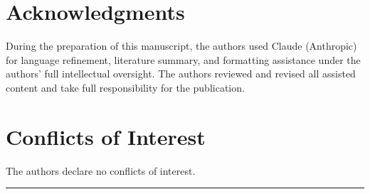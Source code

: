 \documentclass[applsci,article,submit,moreauthors]{Definitions/mdpi}
\begin{document}
\section*{Acknowledgments}

During the preparation of this manuscript, the authors used Claude (Anthropic) for language refinement, literature summary, and formatting assistance under the authors' full intellectual oversight. The authors reviewed and revised all assisted content and take full responsibility for the publication.

\section*{Conflicts of Interest}

The authors declare no conflicts of interest.

\begin{center}\rule{0.5\linewidth}{0.5pt}\end{center}
\end{document}
